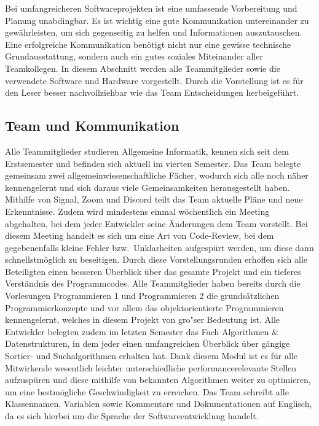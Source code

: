 Bei umfangreicheren Softwareprojekten ist eine umfassende Vorbereitung und Planung unabdingbar.
Es ist wichtig eine gute Kommunikation untereinander zu gew\"ahrleisten, um sich gegenseitig zu helfen und Informationen auszutauschen.
Eine erfolgreiche Kommunikation ben\"otigt nicht nur eine gewisse technische Grundausstattung, sondern auch ein gutes soziales Miteinander aller Teamkollegen.
In diesem Abschnitt werden alle Teammitglieder sowie die verwendete Software und Hardware vorgestellt.
Durch die Vorstellung ist es f\"ur den Leser besser nachvollziehbar wie das Team Entscheidungen herbeigef\"uhrt.

\subsection{Team und Kommunikation}\label{subsec:team-und-kommunikation}
Alle Teammitglieder studieren Allgemeine Informatik, kennen sich seit dem Erstsemester und befinden sich aktuell im vierten Semester.
Das Team belegte gemeinsam zwei allgemeinwissenschaftliche F\"acher, wodurch sich alle noch n\"aher kennengelernt und sich daraus viele Gemeinsamkeiten herausgestellt haben.
Mithilfe von Signal, Zoom und Discord teilt das Team aktuelle Pl\"ane und neue Erkenntnisse.
Zudem wird mindestens einmal w\"ochentlich ein Meeting abgehalten, bei dem jeder Entwickler seine \"Anderungen dem Team vorstellt.
Bei diesem Meeting handelt es sich um eine Art von Code-Review, bei dem gegebenenfalls kleine Fehler bzw.\ Unklarheiten aufgesp\"urt werden, um diese dann schnellstm\"oglich zu beseitigen.
Durch diese Vorstellungsrunden erhoffen sich alle Beteiligten einen besseren \"Uberblick \"uber das gesamte Projekt und ein tieferes Verst\"andnis des Programmcodes.
Alle Teammitglieder haben bereits durch die Vorlesungen Programmieren 1 und Programmieren 2 die grunds\"atzlichen Programmierkonzepte und vor allem das objektorientierte Programmieren kennengelernt, welches in diesem Projekt von gro"ser Bedeutung ist.
Alle Entwickler belegten zudem im letzten Semester das Fach Algorithmen \& Datenstrukturen, in dem jeder einen umfangreichen \"Uberblick \"uber g\"angige Sortier- und Suchalgorithmen erhalten hat.
Dank diesem Modul ist es f\"ur alle Mitwirkende wesentlich leichter unterschiedliche performancerelevante Stellen aufzusp\"uren und diese mithilfe von bekannten Algorithmen weiter zu optimieren, um eine bestm\"ogliche Geschwindigkeit zu erreichen.
Das Team schreibt alle Klassennamen, Variablen sowie Kommentare und Dokumentationen auf Englisch, da es sich hierbei um die Sprache der Softwareentwicklung handelt.

